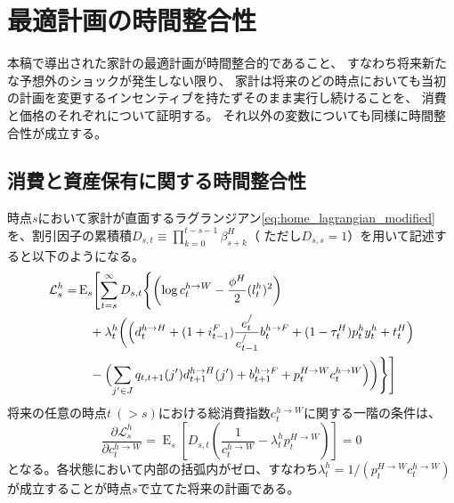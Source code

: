 
\chapter{最適計画の時間整合性}
\label{chap:appendix_time_consistency}

本稿で導出された家計の最適計画が時間整合的であること、
すなわち将来新たな予想外のショックが発生しない限り、
家計は将来のどの時点においても当初の計画を変更するインセンティブを持たずそのまま実行し続けることを、
消費と価格のそれぞれについて証明する。
それ以外の変数についても同様に時間整合性が成立する。

\section{消費と資産保有に関する時間整合性}
時点\(s\)において家計が直面するラグランジアン\eqref{eq:home_lagrangian_modified}を、割引因子の累積積\(D_{s,t}\equiv \prod_{k=0}^{t-s-1}\beta_{s+k}^H\)（ ただし\(D_{s,s}= 1\)）を用いて記述すると以下のようになる。
\begin{equation}
\begin{aligned}
\mathcal{L}_s^h = & \operatorname{E}_s \Biggl[ \sum_{t=s}^{\infty}D_{s,t}\Biggl\{ \left( \log c_t^{h \to W}- \frac{\phi^H}{2}(l_t^h)^2 \right) \\
& \quad + \lambda_t^h \biggl( \Bigl( d_{t}^{h \to H}+ (1+i_{t-1}^{F}) \frac{e_t^{/}}{e_{t-1}^{/}}b_{t}^{h \to F}+ (1 - \tau_t^H) p_t^{h}y_t^{h}+ t_t^H \Bigr) \\
& \quad - \Bigl( \sum_{j' \in J}q_{t, t+1}(j') d_{t+1}^{h \to H}(j') + b_{t+1}^{h \to F}+ p_t^{H \to W}c_t^{h \to W}\Bigr) \biggr) \Biggr\}\Biggr]
\end{aligned}
\end{equation}
将来の任意の時点\(t \ (>s)\)における総消費指数\(c_t^{h \to W}\)に関する一階の条件は、
\begin{equation}
\frac{\partial \mathcal{L}_s^h}{\partial c_t^{h \to W}}= \operatorname{E}_s \left[ D_{s,t}\left( \frac{1}{c_t^{h \to W}}- \lambda_t^h p_t^{H \to W}\right) \right] = 0
\end{equation}
となる。各状態において内部の括弧内がゼロ、すなわち\(\lambda_t^h = 1 / ( p_t^{H \to W}c_t^{h \to W})\)が成立することが時点\(s\)で立てた将来の計画である。

